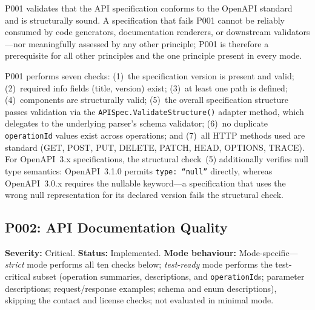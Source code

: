 P001 validates that the API specification conforms to the OpenAPI standard~\cite{openapi} and is structurally sound. A specification that fails P001 cannot be reliably consumed by code generators, documentation renderers, or downstream validators---nor meaningfully assessed by any other principle; P001 is therefore a prerequisite for all other principles and the one principle present in every mode.

P001 performs seven checks: (1)~the specification version is present and valid; (2)~required info fields (title, version) exist; (3)~at least one path is defined; (4)~components are structurally valid; (5)~the overall specification structure passes validation via the \texttt{APISpec.ValidateStructure()} adapter method, which delegates to the underlying parser's schema validator; (6)~no duplicate \texttt{operationId} values exist across operations; and (7)~all HTTP methods used are standard (GET, POST, PUT, DELETE, PATCH, HEAD, OPTIONS, TRACE). For OpenAPI~3.x specifications, the structural check~(5) additionally verifies null type semantics: OpenAPI~3.1.0 permits \texttt{type: ``null''} directly, whereas OpenAPI~3.0.x requires the nullable keyword---a specification that uses the wrong null representation for its declared version fails the structural check.

\subsection{P002: API Documentation Quality}
\label{subsec:p002}

\textbf{Severity:} Critical. \textbf{Status:} Implemented. \textbf{Mode behaviour:} Mode-specific---\textit{strict} mode performs all ten checks below; \textit{test-ready} mode performs the test-critical subset (operation summaries, descriptions, and \texttt{operationId}s; parameter descriptions; request/response examples; schema and enum descriptions), skipping the contact and license checks; not evaluated in minimal mode.

